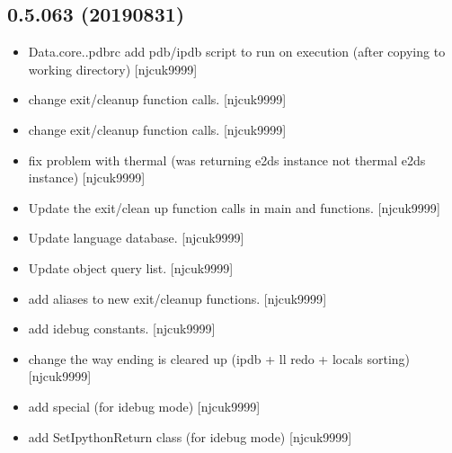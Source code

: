 \documentclass[a4paper,10pt,english]{report}
\begin{document}
\subsection{0.5.063 (2019\sphinxhyphen{}08\sphinxhyphen{}31)}
\label{\detokenize{misc/changelog:id99}}\begin{itemize}
\item {} 
Data.core..pdbrc \sphinxhyphen{} add pdb/ipdb script to run on execution (after
copying to working directory) {[}njcuk9999{]}

\item {} 
 \sphinxhyphen{} change exit/cleanup function
calls. {[}njcuk9999{]}

\item {} 
 \sphinxhyphen{} change exit/cleanup function calls.
{[}njcuk9999{]}

\item {} 
 \sphinxhyphen{} fix problem with thermal (was returning
e2ds instance not thermal e2ds instance) {[}njcuk9999{]}

\item {} 
Update the exit/clean up function calls in main and 
functions. {[}njcuk9999{]}

\item {} 
Update language database. {[}njcuk9999{]}

\item {} 
Update object query list. {[}njcuk9999{]}

\item {} 
 \sphinxhyphen{} add aliases to new exit/cleanup functions.
{[}njcuk9999{]}

\item {} 
 \sphinxhyphen{} add idebug constants.
{[}njcuk9999{]}

\item {} 
 \sphinxhyphen{} change the way ending is cleared up (ipdb +
ll redo + locals sorting) {[}njcuk9999{]}

\item {} 
 \sphinxhyphen{} add special  (for idebug
mode) {[}njcuk9999{]}

\item {} 
 \sphinxhyphen{} add SetIpythonReturn class (for idebug
mode) {[}njcuk9999{]}


\end{itemize}
\end{document}
